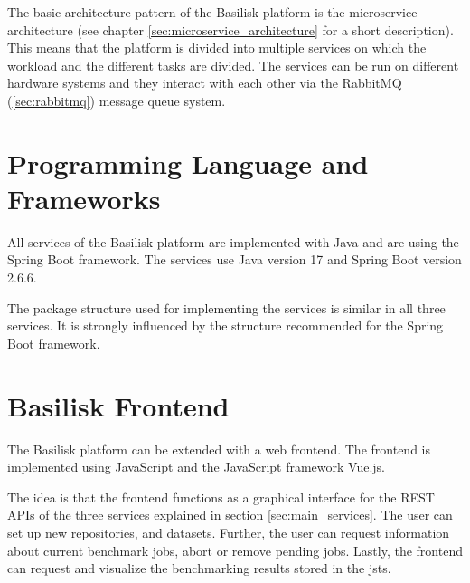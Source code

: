 The basic architecture pattern of the Basilisk platform is the microservice architecture (see chapter \ref{sec:microservice_architecture} for a short description). 
This means that the platform is divided into multiple services on which the workload and the different tasks are divided.
The services can be run on different hardware systems and they interact with each other via the RabbitMQ (\ref{sec:rabbitmq}) message queue system.
\\

\section{Programming Language and Frameworks}
\label{sec:prog_lang_and_framework}
All services of the Basilisk platform are implemented with Java and are using the Spring Boot framework.
The services use Java version 17 and Spring Boot version 2.6.6.

The package structure used for implementing the services is similar in all three services.
It is strongly influenced by the structure recommended for the Spring Boot framework.






\section{Basilisk Frontend}
\label{sec:basilisk_frontend}
The Basilisk platform can be extended with a web frontend.
The frontend is implemented using JavaScript and the JavaScript framework Vue.js.

The idea is that the frontend functions as a graphical interface for the REST APIs of the three services explained in section \ref{sec:main_services}.
The user can set up new repositories, \tsp{} and datasets.
Further, the user can request information about current benchmark jobs, abort or remove pending jobs.
Lastly, the frontend can request and visualize the benchmarking results stored in the \acl{jsts}.







